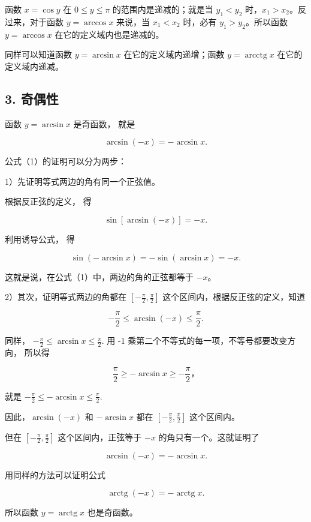 函数 \(x = \cos y\) 在 \(0 \leqslant y \leqslant \pi\)
的范围内是递减的；就是当 \(y_1 < y_2\)
时，\(x_1 > x_2\)。反过来，对于函数 \(y = \arccos x\) 来说，当
\(x_1 < x_2\) 时，必有 \(y_1 > y_2\)。所以函数 \(y = \arccos x\)
在它的定义域内也是递减的。

同样可以知道函数 \(y = \arcsin x\) 在它的定义域内递增；函数
\(y = \operatorname{arcctg} x\) 在它的定义域内递减。

\subsection{3. 奇偶性}

函数 \(y = \arcsin x\) 是奇函数， 就是

\[
\boxed {\arcsin (- x) = - \arcsin x.} \tag {1}
\]

公式（1）的证明可以分为两步：

1）先证明等式两边的角有同一个正弦值。

根据反正弦的定义， 得

\[
\sin [ \arcsin (- x) ] = - x.
\]

利用诱导公式， 得

\[
\sin (- \arcsin x) = - \sin (\arcsin x) = - x.
\]

这就是说，在公式（1）中，两边的角的正弦都等于 \(-x\)。

2）其次，证明等式两边的角都在
\(\left[-\frac{\pi}{2},\frac{\pi}{2}\right]\)
这个区间内，根据反正弦的定义，知道

\[
- \frac {\pi}{2} \leqslant \arcsin (- x) \leqslant \frac {\pi}{2}.
\]

同样， \(-\frac{\pi}{2}\leqslant\arcsin x\leqslant\frac{\pi}{2}.\) 用 -1
乘第二个不等式的每一项，不等号都要改变方向， 所以得

\[
\frac {\pi}{2} \geqslant - \arcsin x \geqslant - \frac {\pi}{2}\text{，}
\]

就是 \(-\frac{\pi}{2} \leqslant -\arcsin x \leqslant \frac{\pi}{2}\).

因此，\(\arcsin(-x)\) 和 \(-\arcsin x\) 都在
\(\left[-\frac{\pi}{2}, \frac{\pi}{2}\right]\) 这个区间内。

但在 \(\left[-\frac{\pi}{2}, \frac{\pi}{2}\right]\) 这个区间内，正弦等于
\(-x\) 的角只有一个。这就证明了

\[
\arcsin (- x) = - \arcsin x.
\]

用同样的方法可以证明公式

\[
\boxed {\operatorname{arctg} (- x) = - \operatorname{arctg} x.}
\]

所以函数 \(y = \operatorname{arctg} x\) 也是奇函数。

